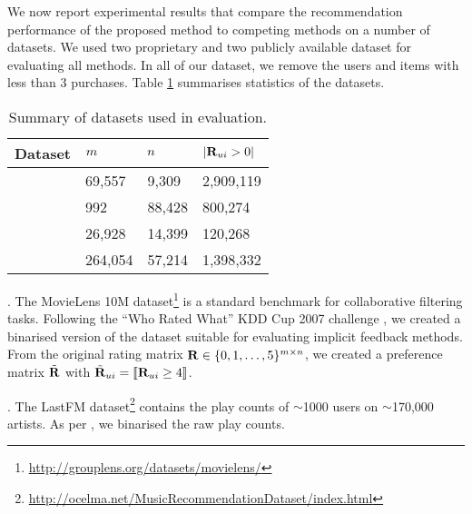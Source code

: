 We now report experimental results that compare the recommendation performance of the proposed method to competing methods on a number of datasets. We used two proprietary and two publicly available dataset for evaluating all methods. In all of our dataset, we remove the users and items with less than 3 purchases.  Table \ref{tbl:datasets} summarises statistics of the datasets.

\begin{table}
	\centering
	\caption{Summary of datasets used in evaluation.}
	\label{tbl:datasets}
	
	\begin{tabular}{llll}
	\toprule
	\toprule	
	\textbf{Dataset} & $m$ & $n$ & $ | \mathbf{R}_{ui} > 0 | $ \\
	\toprule
	\MLens  & 69,557 & 9,309 & 2,909,119 \\
	\LastFM & 992 & 88,428 & 800,274\\
	\Guitar & 26,928 & 14,399 & 120,268 \\
	\Lowes & 264,054 & 57,214 & 1,398,332 \\
	\bottomrule
	\end{tabular}
\end{table}

\MLens. The MovieLens 10M dataset\footnote{\scriptsize \url{http://grouplens.org/datasets/movielens/}} is a standard benchmark for collaborative filtering tasks.
Following the ``Who Rated What'' KDD Cup 2007 challenge \citep{Bennett:2007}, we created a binarised version of the dataset suitable for evaluating implicit feedback methods.
From the original rating matrix $\mathbf{R} \in \{ 0, 1, \ldots, 5 \}^{m \times n}$, we created a preference matrix $\tilde{\mathbf{R}}$ with $\tilde{\mathbf{R}}_{ui} = \llbracket \mathbf{R}_{ui} \geq 4 \rrbracket$.

\LastFM. The LastFM dataset\footnote{{\scriptsize \url{http://ocelma.net/MusicRecommendationDataset/index.html}}} \citep{Celma:2008} contains the play counts of $\sim$1000 users on $\sim$170,000 artists. As per \MLens, we binarised the raw play counts.





